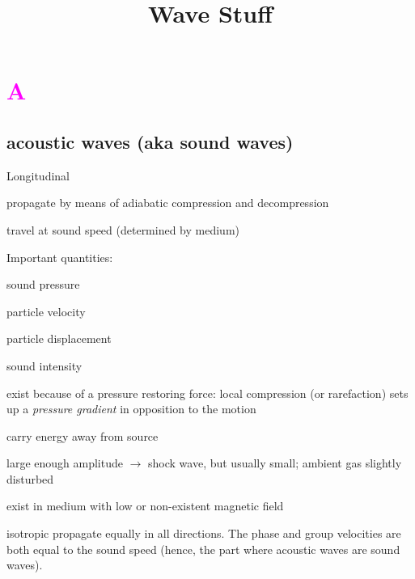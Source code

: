 \documentclass[12pt]{article}
\title{\vspace{-0.5in}Wave Stuff}
\author{}
\date{}
\begin{document}
\maketitle

\vspace{-1in}

\section*{\textcolor{magenta}{A}}

\subsection*{acoustic waves (aka sound waves)}
\begin{itemize*}
    \item Longitudinal
    \item propagate by means of adiabatic compression and decompression
    \item travel at sound speed (determined by medium)
    \item Important quantities:
        \begin{itemize*}
            \item sound pressure
            \item particle velocity
            \item particle displacement
            \item sound intensity
        \end{itemize*}
    \item exist because of a pressure restoring force: local compression
        (or rarefaction) sets up a \emph{pressure gradient} in opposition
        to the motion
    \item carry energy away from source
    \item large enough amplitude $\rightarrow$ shock wave,
        but usually small; ambient gas slightly disturbed
    \item exist in medium with low or non-existent magnetic field
    \item isotropic \- propagate equally in all directions. The phase
        and group velocities are both equal to the sound speed (hence, the
        part where acoustic waves are sound waves).
\end{itemize*}
\end{document}
